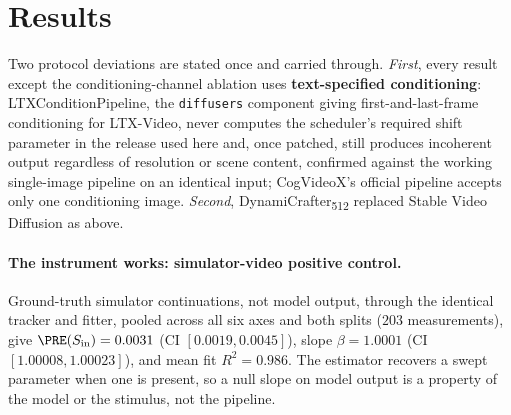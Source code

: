 \documentclass[10pt,twocolumn,letterpaper]{article}
\begin{document}
\section{Results}
\label{sec:results}

Two protocol deviations are stated once and carried through.
\emph{First}, every result except the conditioning-channel ablation uses
\textbf{text-specified conditioning}: LTXConditionPipeline, the
\texttt{diffusers} component giving first-and-last-frame conditioning for
LTX-Video, never computes the scheduler's required shift parameter in the
release used here and, once patched, still produces incoherent output
regardless of resolution or scene content, confirmed against the working
single-image pipeline on an identical input; CogVideoX's official pipeline
accepts only one conditioning image. \emph{Second},
DynamiCrafter\textsubscript{512} replaced Stable Video Diffusion as above.

\paragraph{The instrument works: simulator-video positive control.}
Ground-truth simulator continuations, not model output, through the identical
tracker and fitter, pooled across all six axes and both splits ($203$
measurements), give $\PRE(S_\text{in}) = 0.0031$ (CI $[0.0019, 0.0045]$),
slope $\beta = 1.0001$ (CI $[1.00008, 1.00023]$), and mean fit $R^2 = 0.986$.
The estimator recovers a swept parameter when one is present, so a null slope
on model output is a property of the model or the stimulus, not the pipeline.
\end{document}
